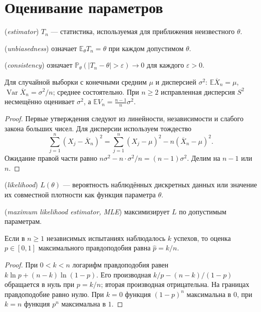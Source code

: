 \section{Оценивание параметров}
\begin{definition} (\emph{estimator}) \(T_n\) — статистика, используемая для приближения неизвестного \(\theta\). \par{} (\emph{unbiasedness}) означает \(\mathbb E_\theta T_n=\theta\) при каждом допустимом \(\theta\). \par{} (\emph{consistency}) означает \(\mathbb P_\theta(|T_n-\theta|>\varepsilon)\to0\) для каждого \(\varepsilon>0\).\end{definition}
\begin{theorem}
Для случайной выборки с конечными средним \(\mu\) и дисперсией \(\sigma^2\): \(\mathbb E\overline X_n=\mu\), \(\operatorname{Var}\overline X_n=\sigma^2/n\); среднее состоятельно. При \(n\ge2\) исправленная дисперсия \(S^2\) несмещённо оценивает \(\sigma^2\), а \(\mathbb EV_n=\frac{n-1}{n}\sigma^2\).
\end{theorem}
\begin{proof}Первые утверждения следуют из линейности, независимости и слабого закона больших чисел. Для дисперсии используем тождество
\[
\sum_{j=1}^n(X_j-\overline X_n)^2=\sum_{j=1}^n(X_j-\mu)^2-n(\overline X_n-\mu)^2.
\]
Ожидание правой части равно \(n\sigma^2-n\cdot\sigma^2/n=(n-1)\sigma^2\). Делим на \(n-1\) или \(n\).\end{proof}
\begin{definition} (\emph{likelihood}) \(L(\theta)\) — вероятность наблюдённых дискретных данных или значение их совместной плотности как функция параметра \(\theta\). \par{} (\emph{maximum likelihood estimator, MLE}) максимизирует \(L\) по допустимым параметрам.\end{definition}
\begin{theorem}
Если в \(n\ge1\) независимых испытаниях наблюдалось \(k\) успехов, то оценка \(p\in[0,1]\) максимального правдоподобия равна \(\widehat p=k/n\).
\end{theorem}
\begin{proof}При \(0<k<n\) логарифм правдоподобия равен \(k\ln p+(n-k)\ln(1-p)\). Его производная \(k/p-(n-k)/(1-p)\) обращается в нуль при \(p=k/n\); вторая производная отрицательна. На границах правдоподобие равно нулю. При \(k=0\) функция \((1-p)^n\) максимальна в \(0\), при \(k=n\) функция \(p^n\) максимальна в \(1\).\end{proof}

